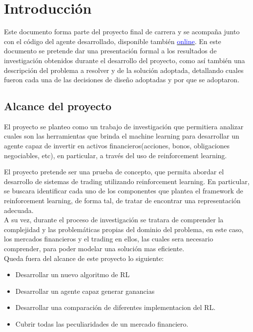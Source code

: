 \chapter{Introducción}

Este documento forma parte del proyecto final de carrera y se acompaña junto con el código del agente desarrollado, disponible también \href{https://github.com/jcaramello/deepQ-stock/}{\textcolor{blue}{online}}. En este documento se pretende dar una presentación formal a los resultados de investigación obtenidos durante el desarrollo del proyecto, como así también una descripción del problema a resolver y de la solución adoptada, detallando cuales fueron cada una de las decisiones de diseño adoptadas y por que se adoptaron.

\section{Alcance del proyecto}
El proyecto se planteo como un trabajo de investigación que permitiera analizar cuales son las herramientas que brinda el machine learning para desarrollar un agente capaz de invertir en activos financieros(acciones, bonos, obligaciones negociables, etc), en particular, a través  del uso de reinforcement learning.

El proyecto pretende ser una prueba de concepto, que permita abordar el desarrollo de sistemas de trading utilizando reinforcement learning. En particular, se buscara identificar cada uno de los componentes que plantea el framework de reinforcement learning, de forma tal, de tratar de encontrar una representación adecuada.
\\
A su vez, durante el proceso de investigación se tratara de comprender la complejidad y las problemáticas propias del dominio del problema, en este caso, los mercados financieros y el trading en ellos, las cuales sera necesario comprender, para poder modelar una solución mas eficiente.
\\
Queda fuera del alcance de este proyecto lo siguiente:

\begin{itemize} %
	\item Desarrollar un nuevo algoritmo de RL
	\item Desarrollar un agente capaz generar ganancias
	\item Desarrollar una comparación de diferentes implementacion del RL.
    \item Cubrir todas las peculiaridades de un mercado financiero.
\end{itemize}

